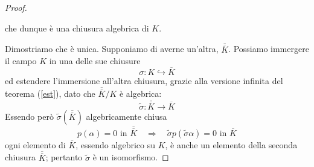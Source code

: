 \begin{multicols}{2}
\begin{proof}
\begin{enumerate}
	\end{enumerate}
che dunque è una chiusura algebrica di $ K $.

Dimostriamo che è unica. Supponiamo di averne un'altra, $\overline{\overline{K}} $. Possiamo immergere il campo $ K $ in una delle sue chiusure
\[ \sigma :  K \hookrightarrow \overline{K} \]
ed estendere l'immersione all'altra chiusura, grazie alla versione infinita del teorema (\ref{est}), dato che $ \overline{\overline{K}}/K $ è algebrica:
\[ \tilde{\sigma} : \overline{\overline{K}} \to \overline{K} \]
Essendo però $ \tilde{\sigma}\left(\overline{\overline{K}}\right) $ algebricamente chiusa
\[ p(\alpha) = 0 \text{ in } \overline{\overline{K}} \quad\Rightarrow\quad \tilde{\sigma}p(\tilde{\sigma}\alpha) = 0 \text{ in } {\overline{K}} \]
ogni elemento di $ \overline{K} $, essendo algebrico su $ K $, è anche un elemento della seconda chiusura $ \overline{\overline{K}} $; pertanto $ \tilde{\sigma} $ è un isomorfismo.

\end{proof}
	
	
	
\end{multicols}


